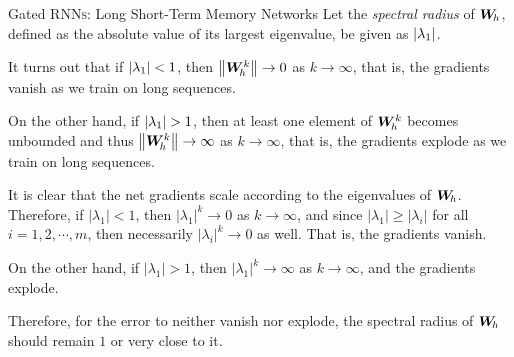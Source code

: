 \begin{frame}{Gated RNN\textsc{s}: Long Short-Term Memory Networks}
Let the {\em
spectral radius} of ${\boldsymbol W}_{\!h}$, defined as the absolute value of its largest
eigenvalue, be
given as $\lvert\lambda_1\rvert$. 

\medskip

It turns out that if $\lvert\lambda_1\rvert < 1$,
then $\left\lVert{\boldsymbol W}_{\!h}^{k}\right\rVert \to 0$ as $k \to
\infty$, that is, the gradients vanish as we train on
long sequences. 


\medskip

On the other hand, if $\lvert\lambda_1\rvert > 1$, then at
least one element of ${\boldsymbol W}_{\!h}^{k}$ becomes unbounded and thus 
$\left\lVert{\boldsymbol W}_{\!h}^{k}\right\rVert \to \infty$ as $k \to \infty$, 
that is, the gradients
explode as we train on long sequences. 

\medskip

It is clear that the net gradients scale according to the eigenvalues of
${\boldsymbol W}_{\!h}$. Therefore, if $|\lambda_1| < 1$, then $|\lambda_1|^{k} \to 0$
as $k \to \infty$, and since $|\lambda_1| \ge |\lambda_i|$ for all
$i=1,2,\cdots,m$, then necessarily $|\lambda_i|^{k} \to 0$ as well.
That is, the gradients vanish.

\medskip

On the other hand, if $|\lambda_1| > 1$, then $|\lambda_1|^{k} \to
\infty$
as $k \to \infty$, and the gradients explode.


\medskip

Therefore, for the error to
neither vanish nor explode, the spectral radius of ${\boldsymbol W}_{\!h}$ should
remain $1$ or very close to it.
\end{frame}
